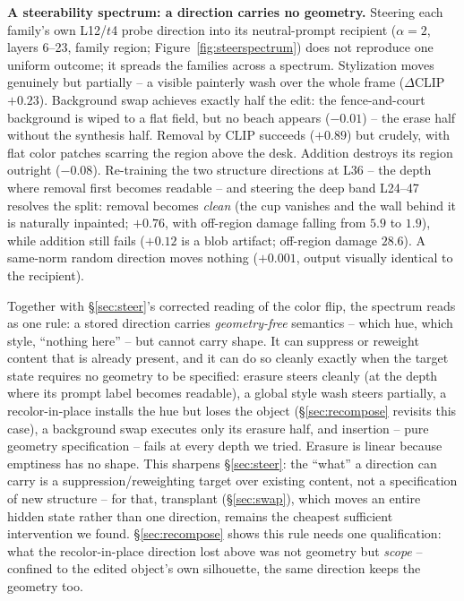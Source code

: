 \documentclass[10pt,twocolumn,letterpaper]{article}
\begin{document}
\textbf{A steerability spectrum: a direction carries no geometry.}
Steering each family's own L12/$t$4 probe direction into its
neutral-prompt recipient ($\alpha{=}2$, layers 6--23, family region;
Figure~\ref{fig:steerspectrum}) does not reproduce one uniform outcome;
it spreads the families across a spectrum. Stylization moves genuinely
but partially -- a visible painterly wash over the whole frame
($\Delta$CLIP $+0.23$). Background swap achieves exactly half the edit:
the fence-and-court background is wiped to a flat field, but no beach
appears ($-0.01$) -- the erase half without the synthesis half. Removal
by CLIP succeeds ($+0.89$) but crudely, with flat color patches scarring
the region above the desk. Addition destroys its region outright
($-0.08$). Re-training the two structure directions at L36 -- the depth
where removal first becomes readable -- and steering the deep band
L24--47 resolves the split: removal becomes \emph{clean} (the cup
vanishes and the wall behind it is naturally inpainted; $+0.76$, with
off-region damage falling from $5.9$ to $1.9$), while addition still
fails ($+0.12$ is a blob artifact; off-region damage $28.6$). A
same-norm random direction moves nothing ($+0.001$, output visually
identical to the recipient).

Together with \S\ref{sec:steer}'s corrected reading of the color flip,
the spectrum reads as one rule: a stored direction carries
\emph{geometry-free} semantics -- which hue, which style, ``nothing
here'' -- but cannot carry shape. It can suppress or reweight content
that is already present, and it can do so cleanly exactly when the
target state requires no geometry to be specified: erasure steers
cleanly (at the depth where its prompt label becomes readable), a global
style wash steers partially, a recolor-in-place installs the hue but
loses the object (\S\ref{sec:recompose} revisits this case), a
background swap executes only its erasure half, and insertion -- pure
geometry specification -- fails at every depth we tried. Erasure is
linear because emptiness has no shape. This sharpens \S\ref{sec:steer}:
the ``what'' a direction can carry is a suppression/reweighting target
over existing content, not a specification of new structure -- for
that, transplant (\S\ref{sec:swap}), which moves an entire hidden state
rather than one direction, remains the cheapest sufficient intervention
we found. \S\ref{sec:recompose} shows this rule needs one qualification:
what the recolor-in-place direction lost above was not geometry but
\emph{scope} -- confined to the edited object's own silhouette, the same
direction keeps the geometry too.
\end{document}
